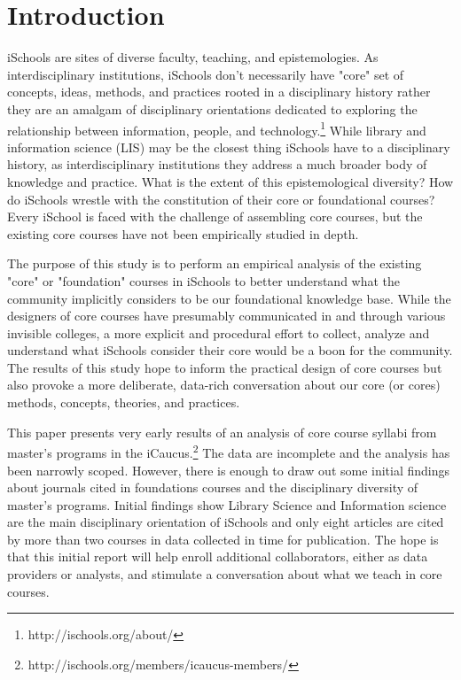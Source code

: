 \documentclass[10pt, letterpaper]{article}
\begin{document}
\section{Introduction}
iSchools are sites of diverse faculty, teaching, and epistemologies. As interdisciplinary institutions, iSchools don't necessarily have "core" set of concepts, ideas, methods, and practices rooted in a disciplinary history rather they are an amalgam of disciplinary orientations dedicated to exploring the relationship between information, people, and technology.\footnote{http://ischools.org/about/} While library and information science (LIS) may be the closest thing iSchools have to a disciplinary history, as interdisciplinary institutions they address a much broader body of knowledge and practice. What is the extent of this epistemological diversity? How do iSchools wrestle with the constitution of their core or foundational courses? Every iSchool is faced with the challenge of assembling core courses, but the existing core courses have not been empirically studied in depth.

The purpose of this study is to perform an empirical analysis of the existing "core" or "foundation" courses in iSchools to better understand what the community implicitly considers to be our foundational knowledge base. While the designers of core courses have presumably communicated in and through various invisible colleges, a more explicit and procedural effort to collect, analyze and understand what iSchools consider their core would be a boon for the community. The results of this study hope to inform the practical design of core courses but also provoke a more deliberate, data-rich conversation about our core (or cores) methods, concepts, theories, and practices.

This paper presents very early results of an analysis of core course syllabi from master's programs in the iCaucus.\footnote{http://ischools.org/members/icaucus-members/} The data are incomplete and the analysis has been narrowly scoped. However, there is enough to draw out some initial findings about journals cited in foundations courses and the disciplinary diversity of master's programs. Initial findings show Library Science and Information science are the main disciplinary orientation of iSchools and only eight articles are cited by more than two courses in data collected in time for publication. The hope is that this initial report will help enroll additional collaborators, either as data providers or analysts, and stimulate a conversation about what we teach in core courses.  
\end{document}
